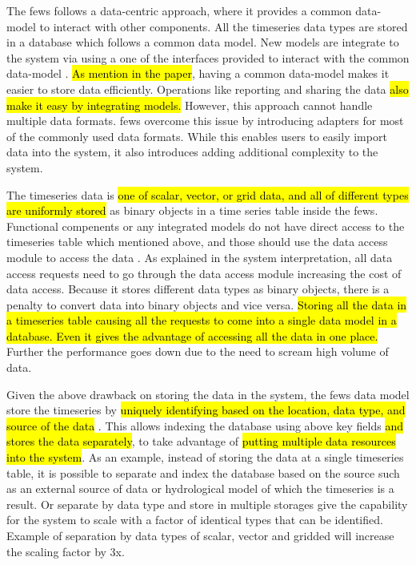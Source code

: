 The \acrshort{fews} follows a data-centric approach, where it provides a common data-model to interact with other components. All the timeseries data types are stored in a database which follows a common data model. New models are integrate to the system via using a one of the interfaces provided to interact with the common data-model \cite{Werner2013TheSystem}. \hl{As mention in the paper}, having a common data-model makes it easier to store data efficiently. Operations like reporting and sharing the data \hl{also make it easy by integrating models.} %
However, this approach cannot handle multiple data formats. \acrshort{fews} overcome this issue by introducing adapters for most of the commonly used data formats. While this enables users to easily import data into the system, it also introduces adding additional complexity to the system.

The timeseries data is \hl{one of scalar, vector, or grid data, and all of different types are uniformly stored} as binary objects in a time series table inside the \acrshort{fews}. Functional compenents or any integrated models do not have direct access to the timeseries table which mentioned above, and those should use the data access module to access the data \cite{Werner2013TheSystem}. As explained in the system interpretation, all data access requests need to go through the data access module increasing the cost of data access. Because it stores different data types as binary objects, there is a penalty to convert data into binary objects and vice versa. \hl{Storing all the data in a timeseries table causing all the requests to come into a single data model in a database. Even it gives the advantage of accessing all the data in one place.} Further the performance goes down due to the need to scream high volume of data.%

Given the above drawback on storing the data in the system, the \acrshort{fews} data model store the timeseries by \hl{uniquely identifying based on the location, data type, and source of the data} \cite{Werner2013TheSystem}. This allows indexing the database using above key fields \hl{and stores the data separately}, to take advantage of \hl{putting multiple data resources into the system}. As an example, instead of storing the data at a single timeseries table, it is possible to separate and index the database based on the source such as an external source of data or hydrological model of which the timeseries is a result. Or separate by data type and store in multiple storages give the capability for the system to scale with a factor of identical types that can be identified. Example of separation by data types of scalar, vector and gridded will increase the scaling factor by 3x.

